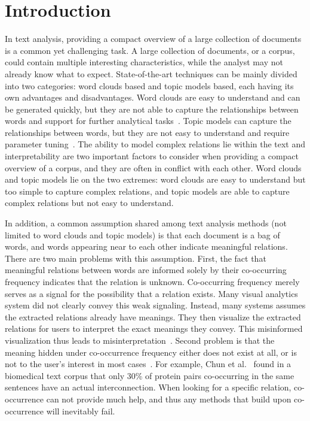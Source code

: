 \section{Introduction}
% 
In text analysis, providing a compact overview of a large collection of documents is a common yet challenging task.
A large collection of documents, or a corpus, could contain multiple interesting characteristics, while the analyst may not already know what to expect.
State-of-the-art techniques can be mainly divided into two categories: word clouds based and topic models based, each having its own advantages and disadvantages.
Word clouds are easy to understand and can be generated quickly, but they are not able to capture the relationships between words and support for further analytical tasks~\cite{viegas2008timelines}.
Topic models can capture the relationships between words, but they are not easy to understand and require parameter tuning~\cite{chuang2013topicdiagnostic}.
The ability to model complex relations lie within the text and interpretability are two important factors to consider when providing a compact overview of a corpus, and they are often in conflict with each other.
Word clouds and topic models lie on the two extremes: word clouds are easy to understand but too simple to capture complex relations, and topic models are able to capture complex relations but not easy to understand.

In addition, a common assumption shared among text analysis methods (not limited to word clouds and topic models) is that each document is a bag of words, and words appearing near to each other indicate meaningful relations.
There are two main problems with this assumption.
First, the fact that meaningful relations between words are informed solely by their co-occurring frequency indicates that the relation is unknown.
Co-occurring frequency merely serves as a signal for the possibility that a relation exists.
Many visual analytics system did not clearly convey this weak signaling. 
Instead, many systems assumes the extracted relations already have meanings.
They then visualize the extracted relations for users to interpret the exact meanings they convey.
This misinformed visualization thus leads to misinterpretation~\cite{lee2017human}.
Second problem is that the meaning hidden under co-occurrence frequency either does not exist at all, or is not to the user's interest in most cases~\cite{EESurveyBiomed}.
For example, Chun et al.~\cite{chun2006extraction} found in a biomedical text corpus that only 30\% of protein pairs co-occurring in the same sentences have an actual interconnection.
When looking for a specific relation, co-occurrence can not provide much help, and thus any methods that build upon co-occurrence will inevitably fail.

